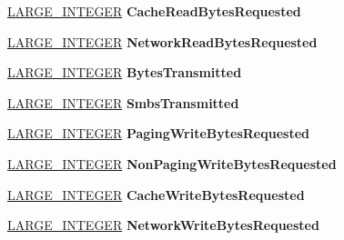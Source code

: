 \begin{DoxyCompactItemize}
\hyperlink{union___l_a_r_g_e___i_n_t_e_g_e_r}{L\+A\+R\+G\+E\+\_\+\+I\+N\+T\+E\+G\+ER} {\bfseries Cache\+Read\+Bytes\+Requested}
\item 
\mbox{\label{struct___s_t_a_t___w_o_r_k_s_t_a_t_i_o_n__0_a95d33207f75528a361024f8c8ad85484}} 
\hyperlink{union___l_a_r_g_e___i_n_t_e_g_e_r}{L\+A\+R\+G\+E\+\_\+\+I\+N\+T\+E\+G\+ER} {\bfseries Network\+Read\+Bytes\+Requested}
\item 
\mbox{\label{struct___s_t_a_t___w_o_r_k_s_t_a_t_i_o_n__0_aa7e13550a9a7f95e6ab145f025eb4850}} 
\hyperlink{union___l_a_r_g_e___i_n_t_e_g_e_r}{L\+A\+R\+G\+E\+\_\+\+I\+N\+T\+E\+G\+ER} {\bfseries Bytes\+Transmitted}
\item 
\mbox{\label{struct___s_t_a_t___w_o_r_k_s_t_a_t_i_o_n__0_a322fecf9dc3c27d51bf0730644b904ec}} 
\hyperlink{union___l_a_r_g_e___i_n_t_e_g_e_r}{L\+A\+R\+G\+E\+\_\+\+I\+N\+T\+E\+G\+ER} {\bfseries Smbs\+Transmitted}
\item 
\mbox{\label{struct___s_t_a_t___w_o_r_k_s_t_a_t_i_o_n__0_ab945cb23f82756b6f05caf00e6720cba}} 
\hyperlink{union___l_a_r_g_e___i_n_t_e_g_e_r}{L\+A\+R\+G\+E\+\_\+\+I\+N\+T\+E\+G\+ER} {\bfseries Paging\+Write\+Bytes\+Requested}
\item 
\mbox{\label{struct___s_t_a_t___w_o_r_k_s_t_a_t_i_o_n__0_a3a5d145d97dc68e74eb8b205a1d325a5}} 
\hyperlink{union___l_a_r_g_e___i_n_t_e_g_e_r}{L\+A\+R\+G\+E\+\_\+\+I\+N\+T\+E\+G\+ER} {\bfseries Non\+Paging\+Write\+Bytes\+Requested}
\item 
\mbox{\label{struct___s_t_a_t___w_o_r_k_s_t_a_t_i_o_n__0_a755a532b069086257465aa837a6dddff}} 
\hyperlink{union___l_a_r_g_e___i_n_t_e_g_e_r}{L\+A\+R\+G\+E\+\_\+\+I\+N\+T\+E\+G\+ER} {\bfseries Cache\+Write\+Bytes\+Requested}
\item 
\mbox{\label{struct___s_t_a_t___w_o_r_k_s_t_a_t_i_o_n__0_a168f1ad53c82108f2c0f2dec5b1b8b84}} 
\hyperlink{union___l_a_r_g_e___i_n_t_e_g_e_r}{L\+A\+R\+G\+E\+\_\+\+I\+N\+T\+E\+G\+ER} {\bfseries Network\+Write\+Bytes\+Requested}

\end{DoxyCompactItemize}
